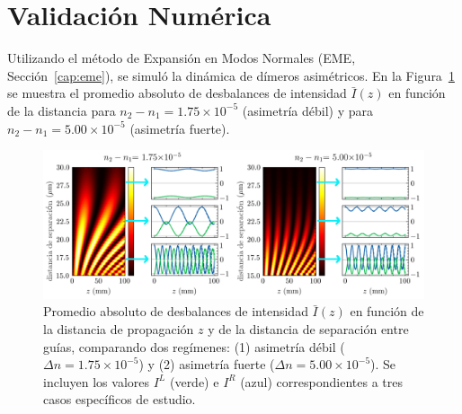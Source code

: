 \section{Validación Numérica}

Utilizando el método de Expansión en Modos Normales (EME, Sección~\ref{cap:eme}), se simuló la dinámica de dímeros asimétricos. En la Figura~\ref{fig:nonotrho-num} se muestra el promedio absoluto de desbalances de intensidad $\bar{I}(z)$ en función de la distancia para $n_2 - n_1 = 1.75 \times 10^{-5}$ (asimetría débil) y para $n_2 - n_1 = 5.00 \times 10^{-5}$ (asimetría fuerte).

\begin{figure}[H]
	\centering
	\includegraphics[width=\linewidth]{media/imbalance-nonortho.png}
	\caption[Promedio absoluto de desbalances de intensidad $\bar{I}(z)$ en función de la distancia de propagación $z$]{Promedio absoluto de desbalances de intensidad $\bar{I}(z)$ en función de la distancia de propagación $z$ y de la distancia de separación entre guías, comparando dos regímenes: (1) asimetría débil ($\Delta n = 1.75 \times 10^{-5}$) y (2) asimetría fuerte ($\Delta n = 5.00 \times 10^{-5}$). Se incluyen los valores $I^L$ (verde) e $I^R$ (azul) correspondientes a tres casos específicos de estudio.}
	\label{fig:nonotrho-num}
\end{figure}
